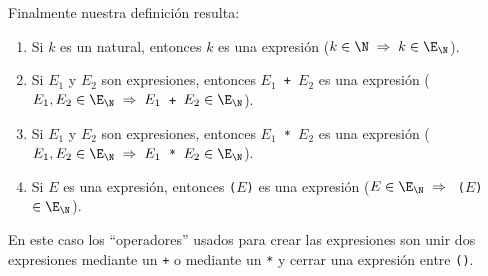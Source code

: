 \begin{ejemplo}
	Finalmente nuestra definición resulta:
	\begin{enumerate}
	\itemsep 0pt
	\item Si $k$ es un natural, entonces $k$ es una expresión ($k\in\N\;\Rightarrow\;k\in\E_\N$).
	\item	Si $E_1$ y $E_2$ son expresiones, entonces \texttt{$E_1$ + $E_2$} es una expresión (\texttt{$E_1,E_2\in\E_\N\;\Rightarrow\;E_1$ + $E_2\in\E_\N$}).
	\item	Si $E_1$ y $E_2$ son expresiones, entonces \texttt{$E_1$ * $E_2$} es una expresión (\texttt{$E_1,E_2\in\E_\N\;\Rightarrow\;E_1$ * $E_2\in\E_\N$}).
	\item	Si $E$ es una expresión, entonces \texttt{($E$)} es una expresión (\texttt{$E\in\E_\N\;\Rightarrow\;$ ($E$) $\in\E_\N$}).
	\end{enumerate}
	
	En este caso los ``operadores'' usados para crear las expresiones son unir dos expresiones mediante un \texttt{+} o mediante un \texttt{*} y cerrar una expresión entre \texttt{()}.
	\end{ejemplo}
	
